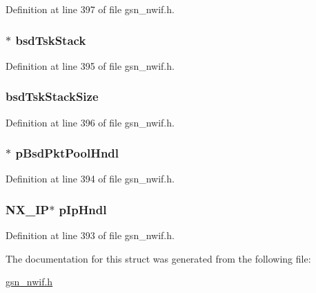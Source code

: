 Definition at line 397 of file gsn\_\-nwif.h.

\hypertarget{a00166_a89fbf1872eb4a156e9c56d2b3eacb825}{
\subsubsection[{bsdTskStack}]{$\ast$ {\bf bsdTskStack}}}
\label{a00166_a89fbf1872eb4a156e9c56d2b3eacb825}


Definition at line 395 of file gsn\_\-nwif.h.

\hypertarget{a00166_a31dfb09fdd700d7cbfd9db7b9001cbdf}{
\subsubsection[{bsdTskStackSize}]{ {\bf bsdTskStackSize}}}
\label{a00166_a31dfb09fdd700d7cbfd9db7b9001cbdf}


Definition at line 396 of file gsn\_\-nwif.h.

\hypertarget{a00166_a3482188b6a89ad4bf9a3b4afe2d6a047}{
\subsubsection[{pBsdPktPoolHndl}]{$\ast$ {\bf pBsdPktPoolHndl}}}
\label{a00166_a3482188b6a89ad4bf9a3b4afe2d6a047}


Definition at line 394 of file gsn\_\-nwif.h.

\hypertarget{a00166_a5e6c19246ee28d20aff00e797fb7b999}{
\subsubsection[{pIpHndl}]{\setlength{\rightskip}{0pt plus 5cm}NX\_\-IP$\ast$ {\bf pIpHndl}}}
\label{a00166_a5e6c19246ee28d20aff00e797fb7b999}


Definition at line 393 of file gsn\_\-nwif.h.



The documentation for this struct was generated from the following file:\begin{DoxyCompactItemize}
\item 
\hyperlink{a00534}{gsn\_\-nwif.h}\end{DoxyCompactItemize}
